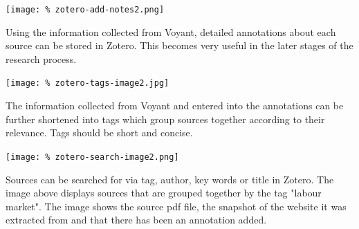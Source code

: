 \documentclass[unknownkeysallowed,usepdftitle=false, parskip=full]{beamer}
\newcommand{\secvariable}{nothing}
\newcommand{\mysection}[1]{\renewcommand{\secvariable}{#1}
}
\begin{document}
\mysection{major}
\begin{frame}\label{\secvariable} %
\begin{center}
\texttt{[image: \%
zotero-add-notes2.png]}
\end{center}

    \parbox{\linewidth}{
Using the information collected from Voyant, detailed annotations about each source can be stored in Zotero. This becomes very useful in the later stages of the research process. 
}
\end{frame}

\mysection{slab}
\begin{frame}\label{\secvariable}
\begin{center}
\texttt{[image: \%
zotero-tags-image2.jpg]}
\end{center}
    \parbox{\linewidth}{

The information collected from Voyant and entered into the annotations can be further shortened into tags which group sources together according to their relevance. Tags should be short and concise.
}

\end{frame}


\mysection{minor}
\begin{frame}\label{\secvariable} %
\begin{center}
\texttt{[image: \%
zotero-search-image2.png]}
\end{center}
\vspace{-0.2cm}

Sources can be searched for via tag, author, key words or title in Zotero. The image above displays sources that are grouped together by the tag "labour market". The image shows the source pdf file, the snapshot of the website it was extracted from and that there has been an annotation added. 

\end{frame}
\end{document}
